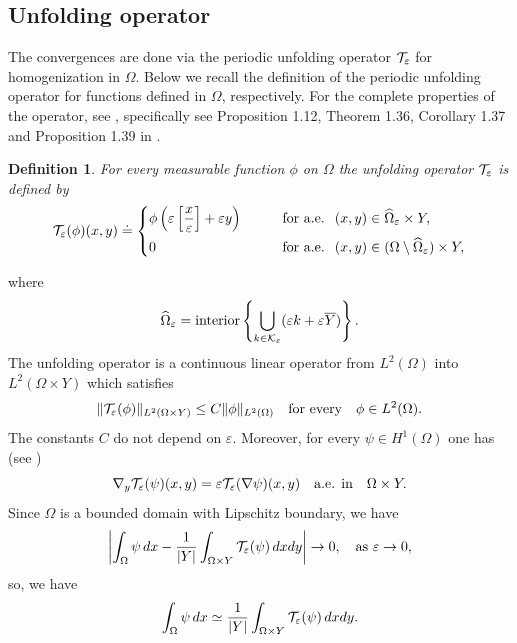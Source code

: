 \documentclass[11pt,a4paper]{article}
\numberwithin{equation}{section}
\def\wo{\overline}
\def\O{\Omega}
\def\e{\varepsilon}
\def\Te{{\cal T}_\varepsilon}
\def\Kc{{\mathcal{K}}}
\def\Mc{{\mathcal{M}}}
\def\wh{\widehat }
\def\X{\times }
\newtheorem{lemma}[theorem]{Lemma}
\newtheorem{definition}{Definition}
\begin{document}
\subsection{Unfolding operator}
The convergences are done via the periodic unfolding operator $\Te$ for homogenization in $\O$. 
Below we recall the definition of the periodic unfolding operator for functions defined in $\O$, respectively. For the complete properties of the operator, see \cite{CDG}, specifically see Proposition 1.12, Theorem 1.36, Corollary 1.37 and Proposition 1.39 in \cite{CDG}. \begin{definition}
	For every measurable function $\phi$ on $\O$ the unfolding operator $\Te$ is defined by 
	$$ \Te(\phi) (x,y) \doteq \left\{ \begin{aligned}
		&\phi \left(\e\left[{x\over \e}\right] + \e y\right) \qquad &&\hbox{for a.e. }\; (x,y)\in  \wh\O_\e\times Y,\\
		&0 \quad &&\hbox{for a.e. }\; (x,y)\in  (\O\setminus\wh\O_\e)\times Y,
	\end{aligned}\right.$$
\end{definition} 
where 
$$\wh \O_\e=\hbox{interior}\left\{\bigcup_{k\in\Kc_\e}(\e k+\e \wo Y)\right\}.$$
The unfolding operator is a continuous linear operator from $L^2(\O)$ into $L^2(\O\X Y)$ which satisfies
$$\|\Te(\phi)\|_{L^2(\O\X Y)}\leq C\|\phi\|_{L^2(\O)}\quad\text{for every}\quad \phi\in L^2(\O).$$
The constants $C$ do not depend on $\e$.
Moreover, for every $\psi\in H^1(\O)$ one has (see \cite[Proposition 1.35]{CDG})
$$ \nabla_y\Te(\psi)(x,y)=\e\Te(\nabla \psi)(x,y) \quad \hbox{a.e. in}\quad \O\X Y.$$
Since $\O$ is a bounded domain with Lipschitz boundary, we have
$$\left|\int_{\O}\psi\,dx-{1\over |Y|}\int_{\O\X Y}\Te(\psi)\,dxdy\right|\to 0,\quad\text{as $\e\to0$},$$
so, we have
\begin{equation}\label{uci}
	\int_{\O}\psi\,dx\simeq{1\over |Y|}\int_{\O\X Y}\Te(\psi)\,dxdy.
\end{equation}
\end{document}
